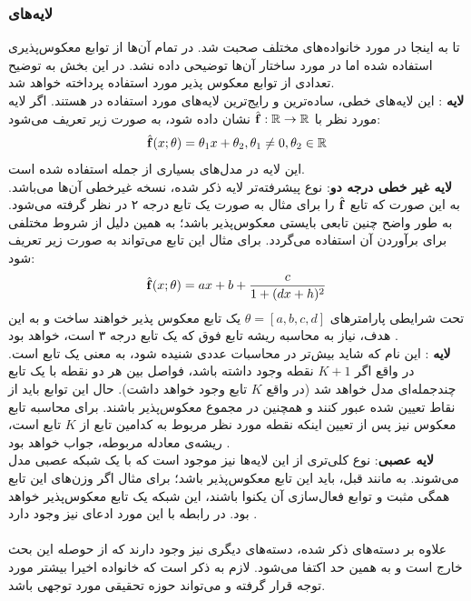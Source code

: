 \subsubsection{لایه‌های \coupling{}}
تا به اینجا در مورد خانواده‌های مختلف \normalizingflownets{} صحبت شد. در تمام آن‌ها از توابع معکوس‌پذیری استفاده شده اما در مورد ساختار آن‌ها توضیحی داده نشد. در این بخش به توضیح تعدادی از توابع معکوس پذیر مورد استفاده پرداخته خواهد شد.
\\
\textbf{لایه
	\coupling{} }:
این لایه‌های خطی، ساده‌ترین و رایج‌ترین لایه‌های مورد استفاده در \normalizingflownets{} هستند. اگر لایه مورد نظر با $\hat{{\bf f}}: {\mathbb{R}} \rightarrow {\mathbb{R}}$ نشان داده شود، به صورت زیر تعریف می‌شود:
\begin{align}
	\hat{{\bf f}} (x; \theta) = \theta_1 x + \theta_2, \theta_1 \neq 0, \theta_2 \in {\mathbb{R}}
\end{align}
این لایه در مدل‌های بسیاری از جمله \cite{iaf, maf} استفاده شده است.
\\
\textbf{لایه \coupling{}
	غیر خطی درجه دو}:
نوع پیشرفته‌تر لایه ذکر شده، نسخه غیرخطی آن‌ها می‌باشد. به این صورت که تابع $\hat{{\bf f}}$ را برای مثال به صورت یک تابع درجه ۲ در نظر گرفته می‌شود. به طور واضح چنین تابعی بایستی معکوس‌پذیر باشد؛‌ به همین دلیل از شروط مختلفی برای برآوردن آن استفاده می‌گردد. برای مثال این تابع می‌تواند به صورت زیر تعریف شود:
\begin{align}
	\hat{{\bf f}}(x; \theta) = ax + b + \frac{c}{1 + (dx + h)^2}
\end{align}
تحت شرایطی پارامترهای $\theta=[a,b,c,d]$ یک تابع معکوس پذیر خواهند ساخت و به این هدف، نیاز به محاسبه ریشه تابع فوق که یک تابع درجه ۳ است، خواهد بود \cite{flow_survey}.
\\
\textbf{لایه \coupling{} \spline{}}:
این نام که شاید بیش‌تر در محاسبات عددی شنیده شود، به معنی یک تابع
است. در واقع اگر $K+1$ نقطه وجود داشته باشد، فواصل بین هر دو نقطه با یک تابع چندجمله‌ای مدل خواهد شد (در واقع $K$ تابع وجود خواهد داشت). حال این توابع باید از نقاط تعیین شده عبور کنند و همچنین در مجموع معکوس‌پذیر باشند. برای محاسبه تابع معکوس نیز پس از تعیین اینکه نقطه مورد نظر مربوط به کدامین تابع از $K$ تابع است، ریشه‌ی معادله مربوطه، جواب خواهد بود \cite{flow_survey}.
\\
\textbf{لایه \coupling{} عصبی}:
نوع کلی‌تری از این لایه‌ها نیز موجود است که با یک شبکه عصبی مدل می‌شوند. به مانند قبل،‌ باید این تابع معکوس‌پذیر باشد؛ برای مثال اگر وزن‌های این تابع همگی مثبت و توابع فعال‌سازی آن یکنوا باشند، این شبکه یک تابع معکوس‌پذیر خواهد بود. در رابطه با این مورد ادعای \univapprox{} نیز وجود دارد \cite{flow_survey}.
\\\\
علاوه بر دسته‌های ذکر شده، دسته‌های دیگری نیز وجود دارند که از حوصله این بحث خارج است و به همین حد اکتفا می‌شود. لازم به ذکر است که خانواده \normalizingflownets{} اخیرا بیشتر مورد توجه قرار گرفته و می‌تواند حوزه تحقیقی مورد توجهی باشد.
